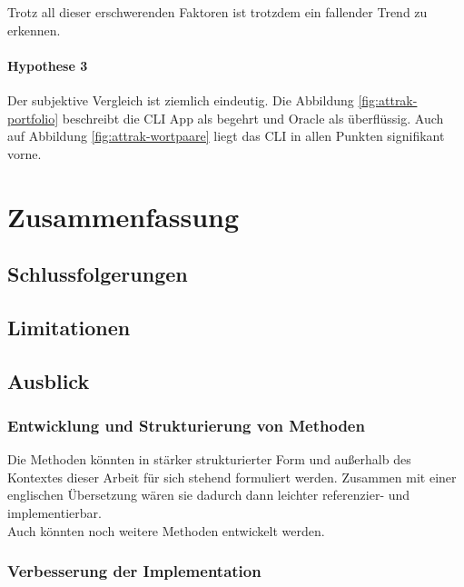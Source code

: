 \documentclass[oneside,bibliography=totocnumbered,BCOR=5mm]{scrbook}
\begin{document}
\medskip

Trotz all dieser erschwerenden Faktoren ist trotzdem ein fallender Trend zu
erkennen.

\subsubsection{Hypothese 3}

Der subjektive Vergleich ist ziemlich eindeutig. Die Abbildung
\ref{fig:attrak-portfolio} beschreibt die CLI App als begehrt und Oracle als
überflüssig. Auch auf Abbildung \ref{fig:attrak-wortpaare} liegt das CLI in
allen Punkten signifikant vorne.

\chapter{Zusammenfassung}
\label{sec:zusammenfassung}

\section{Schlussfolgerungen}
\section{Limitationen}
\section{Ausblick}
\subsection{Entwicklung und Strukturierung von Methoden}

Die Methoden könnten in stärker strukturierter Form und außerhalb des Kontextes
dieser Arbeit für sich stehend formuliert werden. Zusammen mit einer englischen
Übersetzung wären sie dadurch dann leichter referenzier- und implementierbar.
\\
Auch könnten noch weitere Methoden entwickelt werden.

\subsection{Verbesserung der Implementation}
\end{document}
